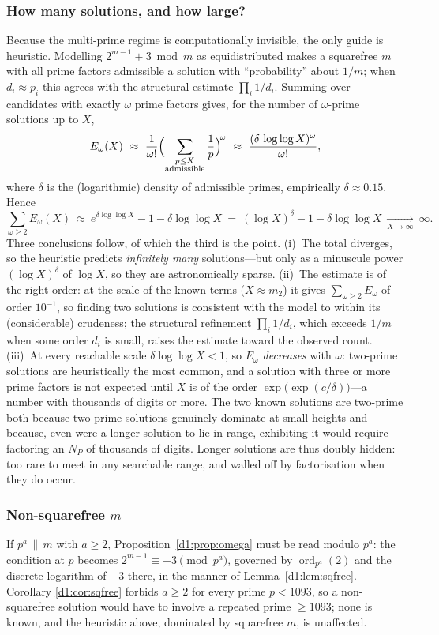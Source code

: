 \documentclass[a4paper]{article}
\theoremstyle{plain}
\theoremstyle{definition}
\theoremstyle{remark}
\newcommand{\ord}{\operatorname{ord}}
\begin{document}
\subsubsection{How many solutions, and how large?}
Because the multi-prime regime is computationally invisible, the only guide is heuristic.
Modelling $2^{m-1}+3\bmod m$ as equidistributed makes a squarefree $m$ with all prime factors
admissible a solution with ``probability'' about $1/m$; when $d_{i}\approx p_{i}$ this agrees
with the structural estimate $\prod_{i}1/d_{i}$. Summing over candidates with exactly $\omega$
prime factors gives, for the number of $\omega$-prime solutions up to $X$,
\[
E_{\omega}(X)\ \approx\ \frac{1}{\omega!}\Bigl(\sum_{\substack{p\le X\\\text{admissible}}}
\frac{1}{p}\Bigr)^{\!\omega}\ \approx\ \frac{(\delta\,\log\log X)^{\omega}}{\omega!},
\]
where $\delta$ is the (logarithmic) density of admissible primes, empirically
$\delta\approx 0.15$. Hence
\[
\sum_{\omega\ge 2}E_{\omega}(X)\ \approx\ e^{\delta\log\log X}-1-\delta\log\log X
\ =\ (\log X)^{\delta}-1-\delta\log\log X\ \xrightarrow[X\to\infty]{}\ \infty.
\]
Three conclusions follow, of which the third is the point. (i)~The total diverges, so the
heuristic predicts \emph{infinitely many} solutions---but only as a minuscule power
$(\log X)^{\delta}$ of $\log X$, so they are astronomically sparse. (ii)~The estimate is of the
right order: at the scale of the known terms ($X\approx m_{2}$) it gives $\sum_{\omega\ge 2}
E_{\omega}$ of order $10^{-1}$, so finding two solutions is consistent with the model to within
its (considerable) crudeness; the structural refinement $\prod_{i}1/d_{i}$, which exceeds $1/m$
when some order $d_{i}$ is small, raises the estimate toward the observed count. (iii)~At every
reachable scale $\delta\log\log X<1$, so $E_{\omega}$ \emph{decreases} with $\omega$: two-prime
solutions are heuristically the most common, and a solution with three or more prime factors is
not expected until $X$ is of the order $\exp\!\bigl(\exp(c/\delta)\bigr)$---a number with
thousands of digits or more. The two known solutions are two-prime both because two-prime
solutions genuinely dominate at small heights and because, even were a longer solution to lie in
range, exhibiting it would require factoring an $N_{P}$ of thousands of digits. Longer solutions
are thus doubly hidden: too rare to meet in any searchable range, and walled off by
factorisation when they do occur.

\subsubsection{Non-squarefree \texorpdfstring{$m$}{m}}
If $p^{a}\,\|\,m$ with $a\ge 2$, Proposition~\ref{d1:prop:omega} must be read modulo $p^{a}$: the
condition at $p$ becomes $2^{m-1}\equiv-3\pmod{p^{a}}$, governed by $\ord_{p^{a}}(2)$ and the
discrete logarithm of $-3$ there, in the manner of Lemma~\ref{d1:lem:sqfree}. Corollary
\ref{d1:cor:sqfree} forbids $a\ge 2$ for every prime $p<1093$, so a non-squarefree solution would
have to involve a repeated prime $\ge 1093$; none is known, and the heuristic above, dominated by
squarefree $m$, is unaffected.
\end{document}
